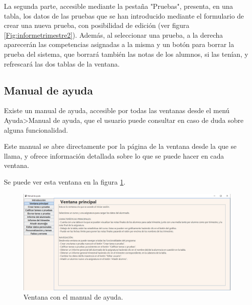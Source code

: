 La segunda parte, accesible mediante la pestaña "Pruebas", presenta, en una tabla, los datos de las pruebas que se han introducido mediante el formulario de crear una nueva prueba, con posibilidad de edición (ver figura \ref{Fig:informetrimestre2}). Además, al seleccionar una prueba, a la derecha aparecerán las competencias asignadas a la misma y un botón para borrar la prueba del sistema, que borrará también las notas de los alumnos, si las tenían, y refrescará las dos tablas de la ventana.

\subsection{Manual de ayuda}
Existe un manual de ayuda, accesible por todas las ventanas desde el menú Ayuda>Manual de ayuda, que el usuario puede consultar en caso de duda sobre alguna funcionalidad.

Este manual se abre directamente por la página de la ventana desde la que se llama, y ofrece información detallada sobre lo que se puede hacer en cada ventana.

Se puede ver esta ventana en la figura \ref{Fig:ayuda}.

\begin{figure}[h]
\centering\includegraphics[width=1\linewidth]{figs/ayuda.png}
\caption{Ventana con el manual de ayuda.}
\label{Fig:ayuda}
\end{figure}